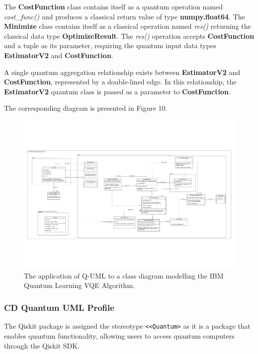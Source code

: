 \documentclass{article}
\begin{document}
The \textbf{CostFunction} class contains itself as a quantum operation named \textit{cost\_func()} and produces a classical return value of type \textbf{numpy.float64}. The \textbf{Minimize} class contains itself as a classical operation named \textit{res()} returning the classical data type \textbf{OptimizeResult}. The \textit{res()} operation accepts \textbf{CostFunction} and a tuple as its parameter, requiring the quantum input data types \textbf{EstimatorV2} and \textbf{CostFunction}.

A single quantum aggregation relationship exists between \textbf{EstimatorV2} and \textbf{CostFunction}, represented by a double-lined edge. In this relationship, the \textbf{EstimatorV2} quantum class is passed as a parameter to \textbf{CostFunction}.

The corresponding diagram is presented in Figure 10.

\begin{figure}
    \centering
    \includegraphics[width=1\linewidth]{VQE QUML CD Final Version.pdf}
    \caption{The application of Q-UML to a class diagram modelling the IBM Quantum Learning VQE Algorithm.}
    \label{fig:Q-UML_CD}
\end{figure}

\subsubsection{CD Quantum UML Profile}

The Qiskit package is assigned the stereotype \texttt{<<Quantum>} as it is a package that enables quantum functionality, allowing users to access quantum computers through the Qiskit SDK. 
\end{document}
